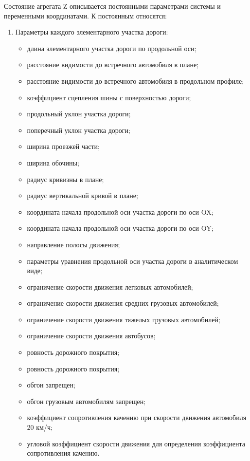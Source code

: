 \documentclass[a4paper,14pt]{article}
\begin{document}
Состояние агрегата Z описывается постоянными параметрами системы и переменными координатами. К постоянным относятся:
\begin{enumerate}
\item Параметры каждого элементарного участка дороги:

\begin{itemize}

\item длина элементарного участка дороги по продольной оси;
\item расстояние видимости до встречного автомобиля в плане;
\item расстояние видимости до встречного автомобиля в продольном профиле;
\item коэффициент сцепления шины с поверхностью дороги;
\item продольный уклон участка дороги;
\item поперечный уклон участка дороги;
\item ширина проезжей части;
\item ширина обочины;
\item радиус кривизны в плане;
\item радиус вертикальной кривой в плане;
\item координата начала продольной оси участка дороги по оси OX;
\item координата начала продольной оси участка дороги по оси OY;
\item направление полосы движения;
\item параметры уравнения продольной оси участка дороги в аналитическом виде;
\item ограничение скорости движения легковых автомобилей;
\item ограничение скорости движения средних грузовых автомобилей;
\item ограничение скорости движения тяжелых грузовых автомобилей;
\item ограничение скорости движения автобусов;
\item ровность дорожного покрытия;
\item ровность дорожного покрытия;
\item обгон запрещен;
\item обгон грузовым автомобилям запрещен;
\item коэффициент сопротивления качению при скорости движения автомобиля 20 км/ч;
\item угловой коэффициент скорости движения для определения коэффициента сопротивления качению.
\end{itemize}


\end{enumerate}
\end{document}
